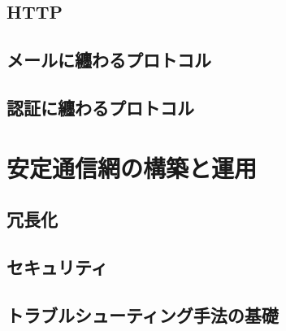 \documentclass[a4j,12pt]{jreport}
\makeatletter
\newcommand{\beginappendix}{
  \setcounter{chapter}{0}
  \renewcommand{\prechaptername}{付録}
  \renewcommand{\postchaptername}{} 
  \renewcommand{\thechapter}{\@Alph\c@chapter}
  \renewcommand{\thesection}{\@Alph\c@chapter.\@arabic\c@section}
  \renewcommand{\thesubsection}{\@Alph\c@chapter.\@arabic\c@section.\@arabic\c@subsection}
}
\makeatother
\begin{document}
\chapter{HTTP}

\chapter{メールに纏わるプロトコル} %

\chapter{認証に纏わるプロトコル} %


\part{安定通信網の構築と運用}

\chapter{冗長化}

\chapter{セキュリティ}

\chapter{トラブルシューティング手法の基礎}


%

%

%

%

%

\printindex
\end{document}
